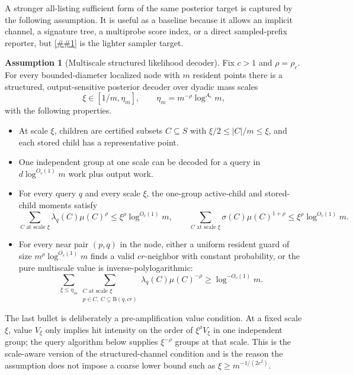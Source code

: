 \documentclass[10pt]{article}
\newcommand{\cref}[1]{\ref{##1}}
\theoremstyle{definition}
\newtheorem{assumption}[theorem]{Assumption}
\newcommand{\Ball}{\mathrm{B}}
\begin{document}
A stronger all-listing sufficient form of the same posterior target is captured
by the following assumption.  It is useful as a baseline because it allows an
implicit channel, a signature tree, a multiprobe score index, or a direct
sampled-prefix reporter, but \cref{asm:normalized-likelihood-leader-sampler}
is the lighter sampler target.

\begin{assumption}[Multiscale structured likelihood decoder]\label{asm:multiscale-structured-likelihood}
   Fix $c>1$ and $\rho=\rho_c$. For every bounded-diameter localized node with $m$ resident points there is a structured, output-sensitive posterior decoder over dyadic mass scales
   \[
      \xi\in[1/m,\eta_m],
      \qquad
      \eta_m=m^{-\rho}\log^{A_c}m,
   \]
   with the following properties.
   \begin{itemize}
      \item At scale $\xi$, children are certified subsets $C\subseteq S$ with $\xi/2\le |C|/m\le\xi$, and each stored child has a representative point.
      \item One independent group at one scale can be decoded for a query in $d\log^{O_c(1)}m$ work plus output work.
      \item For every query $q$ and every scale $\xi$, the one-group active-child and stored-child moments satisfy
      \[
         \sum_{C\text{ at scale }\xi}\lambda_q(C)\mu(C)^\rho
         \le
         \xi^\rho\log^{O_c(1)}m,
         \qquad
         \sum_{C\text{ at scale }\xi}\sigma(C)\mu(C)^{1+\rho}
         \le
         \xi^\rho\log^{O_c(1)}m.
      \]
      \item For every near pair $(p,q)$ in the node, either a uniform resident guard of size $m^\rho\log^{O_c(1)}m$ finds a valid $cr$-neighbor with constant probability, or the pure multiscale value is inverse-polylogarithmic:
      \[
         \sum_{\xi\le\eta_m}
         \sum_{\substack{C\text{ at scale }\xi\\p\in C,\ C\subseteq\Ball(q,cr)}}
         \lambda_q(C)\mu(C)^{-\rho}
         \ge
         \log^{-O_c(1)}m.
      \]
   \end{itemize}
\end{assumption}

The last bullet is deliberately a pre-amplification value condition. At a fixed
scale $\xi$, value $V_\xi$ only implies hit intensity on the order of
$\xi^\rho V_\xi$ in one independent group; the query algorithm below supplies
$\xi^{-\rho}$ groups at that scale. This is the scale-aware version of the
structured-channel condition and is the reason the assumption does not impose a
coarse lower bound such as $\xi\ge m^{-1/(2c^2)}$.
\end{document}

